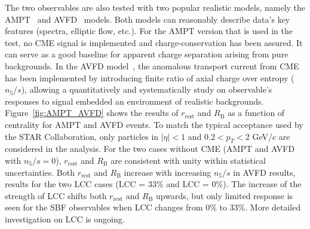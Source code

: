 The two observables are also tested with two popular realistic models, namely  the AMPT~\cite{amptLin:2004}  and  AVFD~\cite{avfdref} models. Both models can reasonably describe data's key features (spectra,  elliptic flow, etc.).  For the AMPT version that is used in the test, no CME signal is implemented and charge-conservation has been assured. It can serve as a good baseline for apparent charge separation arising from pure backgrounds.
In the  AVFD model~\cite{avfdref}, the anomalous transport current from CME has been implemented by introducing finite ratio of axial charge over entropy ($n_{5}/s$),
allowing a  quantitatively and systematically study on observable's responses to signal embedded an environment of realistic backgrounds.  
Figure~\ref{fig:AMPT_AVFD} shows the results of  $r_{\mathrm{rest}}$ and $R_{\mathrm{B}}$ as a function of centrality for AMPT and AVFD events. To match the typical acceptance used by the STAR Collaboration, only particles in $|\eta|<1$ and $0.2 < p_{T} < 2$ GeV/$c$ are considered in the analysis.
For the two cases without  CME (AMPT and AVFD with $n_{5}/s = 0$), $r_{\mathrm{rest}}$ and $R_{\mathrm{B}}$ are consistent with unity within statistical uncertainties.  Both $r_{\mathrm{rest}}$ and $R_{\mathrm{B}}$ increase with increasing $n_{5}/s$ in AVFD results, results for the two LCC cases  (LCC =  33\% and LCC = 0\%).  The increase of the strength of LCC shifts both $r_{\mathrm{rest}}$ and $R_{\mathrm{B}}$ upwards, but only limited response is seen for the SBF observables when LCC changes from 0\% to 33\%. More detailed investigation on LCC is ongoing. 

\vspace{-0.08cm}

\vspace{-0.08cm}

